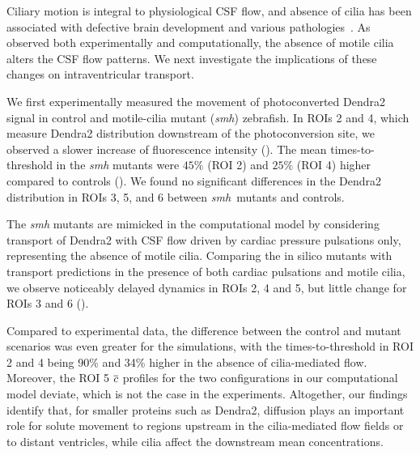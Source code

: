 \documentclass{WileyMSP-template}
\begin{document}
Ciliary motion is integral to physiological CSF flow,
and absence of cilia has been associated with defective
brain development and various pathologies~\cite{Eichele2020Cilia-drivenVentricle,
Olstad2019CiliaryDevelopment, Faubel2016Cilia-basedVentricles,
Guirao2010CouplingCilia, Afzelius2004CiliaRelatedDiseases,
Sawamoto2006NewBrain, Yoshiba2014RolesSymmetry,
Hirokawa2006NodalAsymmetry}.
As observed both experimentally and computationally,
the absence of motile cilia alters the CSF flow patterns. 
We next investigate the implications of these changes on intraventricular
transport.

We first experimentally measured the movement of photoconverted
Dendra2 signal in control and motile-cilia mutant (\emph{smh})
zebrafish. In ROIs 2 and 4, which measure Dendra2 distribution
downstream of the photoconversion site, we observed a slower increase
of fluorescence intensity (). The mean times-to-threshold
in the \emph{smh} mutants were $45\%$ (ROI 2) and $25\%$ (ROI 4) higher
compared to controls (). We found no significant differences
in the Dendra2 distribution in ROIs 3, 5, and 6 between
\emph{smh} mutants and controls.

The \emph{smh} mutants are mimicked in the computational model by
considering transport of Dendra2 with CSF flow driven by cardiac
pressure pulsations only, representing the absence of motile
cilia. Comparing the in silico mutants with transport predictions in
the presence of both cardiac pulsations and motile cilia, we observe
noticeably delayed dynamics in ROIs 2, 4 and 5, but little change for
ROIs 3 and 6 ().

Compared to experimental data, the difference between the control and
mutant scenarios was even greater for the simulations, with the
times-to-threshold in ROI 2 and 4 being 90\% and 34\% higher in the
absence of cilia-mediated flow. Moreover, the ROI 5 $\overline{c}$ profiles
for the two configurations in our computational model deviate,
which is not the case in the experiments. Altogether,
our findings identify that, for smaller proteins such as Dendra2,
diffusion plays an important role for
solute movement to regions upstream in the cilia-mediated flow fields or to
distant ventricles, while cilia affect the downstream mean concentrations.
\end{document}
